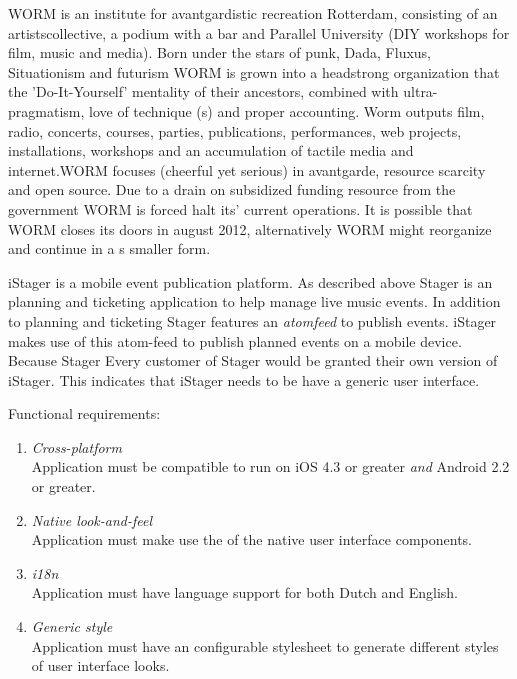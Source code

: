 WORM is an institute for avantgardistic recreation Rotterdam, consisting of an artistscollective, a podium with a bar and Parallel University (DIY workshops for film, music and media). Born under the stars of punk, Dada, Fluxus, Situationism and futurism WORM is grown into a headstrong organization that the 'Do-It-Yourself' mentality of their ancestors, combined with ultra-pragmatism, love of technique (s) and proper accounting. Worm outputs film, radio, concerts, courses, parties, publications, performances, web projects, installations, workshops and an accumulation of tactile media and internet.WORM focuses (cheerful yet serious) in avantgarde, resource scarcity and open source. \cite{WORM2012} Due to a drain on subsidized funding resource from the government WORM is forced halt its' current operations. It is possible that WORM closes its doors in august 2012, alternatively WORM might reorganize and continue in a s smaller form.

iStager is a mobile event publication platform. As described above Stager is an planning and ticketing application to help manage live music events. In addition to planning and ticketing Stager features an \emph{atomfeed} to publish events. iStager makes use of this atom-feed to publish planned events on a mobile device. Because Stager
Every customer of Stager would be granted their own version of iStager. This indicates that iStager needs to be have a generic user interface.



Functional requirements:
\begin{enumerate}
\item \emph{Cross-platform}\\Application must be compatible to run on iOS 4.3 or greater \emph{and} Android 2.2 or greater.
\item \emph{Native look-and-feel}\\Application must make use the of the native user interface components.
\item \emph{i18n}\\Application must have language support for both Dutch and English.
\item \emph{Generic style}\\Application must have an configurable stylesheet to generate different styles of user interface looks.
\end{enumerate}


